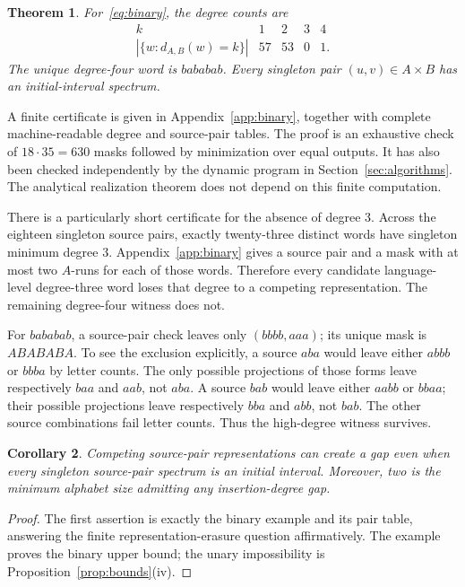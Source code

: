 \documentclass[11pt,letterpaper]{article}
\newtheorem{theorem}{Theorem}[section]
\newtheorem{corollary}[theorem]{Corollary}
\theoremstyle{definition}\newtheorem{definition}[theorem]{Definition}
\theoremstyle{remark}\newtheorem{remark}[theorem]{Remark}
\theoremstyle{definition}\newtheorem{question}[theorem]{Question}
\begin{document}
\begin{theorem}\label{thm:binary}
For~\eqref{eq:binary}, the degree counts are
\[
 \begin{array}{c|rrrr}
 k&1&2&3&4\\\hline
 |\{w:d_{A,B}(w)=k\}|&57&53&0&1.
 \end{array}
\]
The unique degree-four word is $bababab$. Every singleton pair $(u,v)\in A\times B$ has an initial-interval spectrum.
\end{theorem}

A finite certificate is given in Appendix~\ref{app:binary}, together with complete machine-readable degree and source-pair tables. The proof is an exhaustive check of $18\cdot35=630$ masks followed by minimization over equal outputs. It has also been checked independently by the dynamic program in Section~\ref{sec:algorithms}. The analytical realization theorem does not depend on this finite computation.

There is a particularly short certificate for the absence of degree $3$. Across the eighteen singleton source pairs, exactly twenty-three distinct words have singleton minimum degree $3$. Appendix~\ref{app:binary} gives a source pair and a mask with at most two $A$-runs for each of those words. Therefore every candidate language-level degree-three word loses that degree to a competing representation. The remaining degree-four witness does not.

For $bababab$, a source-pair check leaves only $(bbbb,aaa)$; its unique mask is $ABABABA$. To see the exclusion explicitly, a source $aba$ would leave either $abbb$ or $bbba$ by letter counts. The only possible projections of those forms leave respectively $baa$ and $aab$, not $aba$. A source $bab$ would leave either $aabb$ or $bbaa$; their possible projections leave respectively $bba$ and $abb$, not $bab$. The other source combinations fail letter counts. Thus the high-degree witness survives.

\begin{corollary}
Competing source-pair representations can create a gap even when every singleton source-pair spectrum is an initial interval. Moreover, two is the minimum alphabet size admitting any insertion-degree gap.
\end{corollary}
\begin{proof}
The first assertion is exactly the binary example and its pair table, answering the finite representation-erasure question affirmatively. The example proves the binary upper bound; the unary impossibility is Proposition~\ref{prop:bounds}(iv).
\end{proof}
\end{document}
